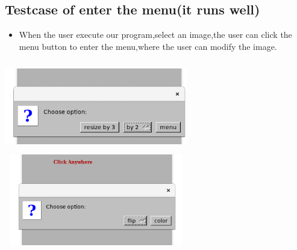 \documentclass{article}
\begin{document}
\subsection*{Testcase of enter the menu(it runs well)}
\begin{itemize}
	\item When the user execute our program,select an image,the user can click the menu button to enter the menu,where the user can modify the image.
\end{itemize}
\includegraphics[width = 8cm, height = 4cm]{5.png}
\includegraphics[width = 8cm, height = 4cm]{4.png}
\newpage
\end{document}
